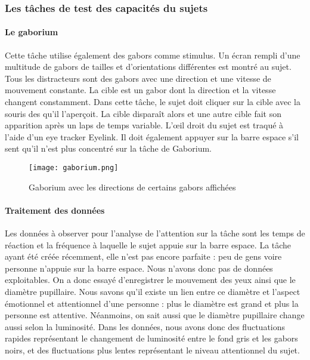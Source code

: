 \subsubsection{Les tâches de test des capacités du sujets}

\paragraph{Le gaborium}Cette tâche utilise également des \glspl{gabor} comme stimulus. Un écran rempli d'une multitude de gabors de tailles et d'orientations différentes est montré
au sujet. Tous les distracteurs sont des gabors avec une direction et une vitesse de mouvement constante. La cible est un gabor dont la direction et la vitesse changent constamment.
Dans cette tâche, le sujet doit cliquer sur la cible avec la souris des qu'il l'aperçoit. La cible disparaît alors et une autre cible fait son apparition après un laps de temps
variable. L'œil droit du sujet est traqué à l'aide d'un eye tracker Eyelink. Il doit également appuyer sur la barre espace s'il sent qu'il n'est plus concentré sur la tâche de Gaborium.

\begin{figure}[H]
    \begin{center}
    \texttt{[image: gaborium.png]}
    \end{center}
    \caption{Gaborium avec les directions de certains gabors affichées}
\label{Gaborium}
\end{figure}

\paragraph{Traitement des données}Les données à observer pour l'analyse de l'attention sur la tâche sont les temps de réaction et la fréquence à laquelle le sujet appuie sur la barre
espace. La tâche ayant été créée récemment, elle n'est pas encore parfaite : peu de gens voire personne n'appuie sur la barre espace. Nous n'avons donc pas de données exploitables.
On a donc essayé d'enregistrer le mouvement des yeux ainsi que le diamètre pupillaire. Nous savons qu'il existe un lien entre ce diamètre et l'aspect émotionnel et attentionnel d'une
personne : plus le diamètre est grand et plus la personne est attentive. Néanmoins, on sait aussi que le diamètre pupillaire change aussi selon la luminosité. Dans les données, nous
avons donc des fluctuations rapides représentant le changement de luminosité entre le fond gris et les gabors noirs, et des fluctuations plus lentes représentant le niveau attentionnel
du sujet.


